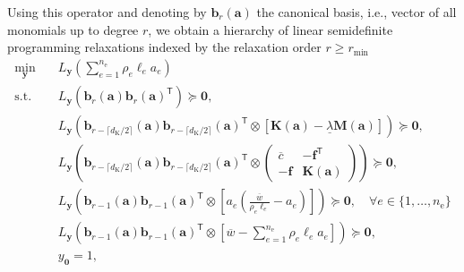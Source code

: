 \documentclass[preprint,3p]{elsarticle}
\newcommand{\T}{^{\mathsf T}}
\newcommand{\nel}{n_\mathrm{e}}
\newcommand{\dK}{d_\mathrm{K}}
\numberwithin{equation}{section}
\begin{document}
Using this operator and denoting by $\mathbf{b}_r(\mathbf{a})$ the canonical basis, i.e., vector of all monomials up to degree $r$, we obtain a hierarchy of linear semidefinite programming relaxations indexed by the relaxation order $r \ge r_{\min}$
%
\begin{subequations}\label{eq:sos_fv}
  \begin{align}
    \min_{\mathbf{y}} \quad & L_\mathbf{y}\left(\sum_{e=1}^{\nel} \rho_e \ell_e a_e\right) \\
    \text{s.t.} \quad & L_\mathbf{y}\left(\mathbf{b}_r(\mathbf{a})\mathbf{b}_r(\mathbf{a})\T\right) \succeq \mathbf{0},\label{eq:sos_fv:moment} \\
    & L_\mathbf{y}\left(\mathbf{b}_{r-\lceil \dK/2\rceil}(\mathbf{a})\mathbf{b}_{r-\lceil \dK/2\rceil}(\mathbf{a})\T \otimes \left[\mathbf{K}(\mathbf{a}) - \underline{\lambda} \mathbf{M}(\mathbf{a})\right]\right) \succeq \mathbf{0}, \label{eq:sos_fv:fv}\\
    & L_\mathbf{y}\left(\mathbf{b}_{r-\lceil \dK/2\rceil}(\mathbf{a})\mathbf{b}_{r-\lceil \dK/2\rceil}(\mathbf{a})\T \otimes
      \begin{pmatrix} \overline{c} & -\mathbf{f}\T \\ -\mathbf{f} & \mathbf{K}(\mathbf{a})
    \end{pmatrix}\right) \succeq \mathbf{0}, \label{eq:sos_fv:static}\\
    & L_\mathbf{y}\left(\mathbf{b}_{r-1}(\mathbf{a})\mathbf{b}_{r-1}(\mathbf{a})\T \otimes \left[a_e \left(\frac{\overline{w}}{\rho_e \ell_e} - a_e\right)\right] \right) \succeq \mathbf{0}, \quad \forall e \in \{1,\dots,\nel\}\label{eq:sos_fv:compact} \\
    & L_\mathbf{y}\left(\mathbf{b}_{r-1}(\mathbf{a})\mathbf{b}_{r-1}(\mathbf{a})\T \otimes \left[\overline{w} - \sum_{e=1}^{\nel} \rho_e \ell_e a_e\right] \right) \succeq \mathbf{0},\label{eq:sos_fv:ub} \\
    & y_\mathbf{0} = 1,\label{eq:sos_fv:const}
  \end{align}
\end{subequations}
%
\end{document}
